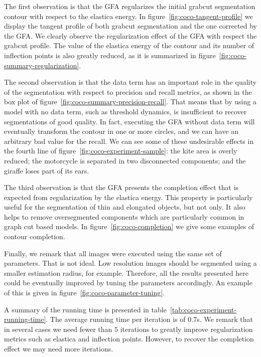 \documentclass[smallextended]{svjour3}
\begin{document}
%
%
%
The first observation is that the GFA regularizes the initial grabcut segmentation contour with respect to the elastica energy. In figure~\ref{fig:coco-tangent-profile} we display the tangent profile of both grabcut segmentation and the one corrected by the GFA. We clearly observe the regularization effect of the GFA with respect the grabcut profile. The value of the elastica energy of the contour and its number of inflection points is also greatly reduced, as it is summarized in figure~\ref{fig:coco-summary-regularization}.

The second observation is that the data term has an important role in the quality of the segmentation with respect to precision and recall metrics, as shown in the box plot of figure~\ref{fig:coco-summary-precision-recall}. That means that by using a model with no data term, such as threshold dynamics, is insufficient to recover segmentations of good quality. In fact, executing the GFA without data term will eventually transform the contour in one or more circles, and we can have an arbitrary bad value for the recall. We can see some of these undesirable effects in the fourth line of figure~\ref{fig:coco-experiment-sample}: the kite area is overly reduced; the motorcycle is separated in two disconnected components; and the giraffe loses part of its ears.

The third observation is that the GFA presents the completion effect that is expected from regularization by the elastica energy. This property is particularly useful for the segmentation of thin and elongated objects, but not only. It also helps to remove oversegmented components which are particularly common in graph cut based models. In figure~\ref{fig:coco-completion} we give some examples of contour completion.

Finally, we remark that all images were executed using the same set of parameters. That is not ideal. Low resolution images should be segmented using a smaller estimation radius, for example. Therefore, all the results presented here could be eventually improved by tuning the parameters accordingly. An example of this is given in figure~\ref{fig:coco-parameter-tuning}.

A summary of the running time is presented in table~\ref{tab:coco-experiment-running-time}. The average running time per iteration is of $0.7$s. We remark that in several cases we need fewer than $5$ iterations to greatly improve regularization metrics such as elastica and inflection points. However, to recover the completion effect we may need more iterations.
\end{document}

